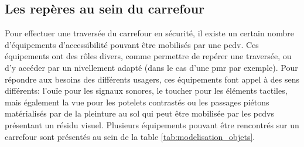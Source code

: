 \subsection{Les repères au sein du carrefour}

\label{sec:mod_repere_carrefour}

Pour effectuer une traversée du carrefour en sécurité, il existe un certain nombre d'équipements d'accessibilité pouvant être mobilisés par une \gls{pcdv}. Ces équipements ont des rôles divers, comme permettre de repérer une traversée, ou d'y accéder par un nivellement adapté (dans le cas d'une \gls{pmr} par exemple). Pour répondre aux besoins des différents usagers, ces équipements font appel à des sens différents: l'ouïe pour les signaux sonores, le toucher pour les éléments tactiles, mais également la vue pour les potelets contrastés ou les passages piétons matérialisés par de la pleinture au sol qui peut être mobilisée par les \glspl{pcdv} présentant un résidu visuel. Plusieurs équipements pouvant être rencontrés sur un carrefour sont présentés au sein de la table \ref{tab:modelisation_objets}.

